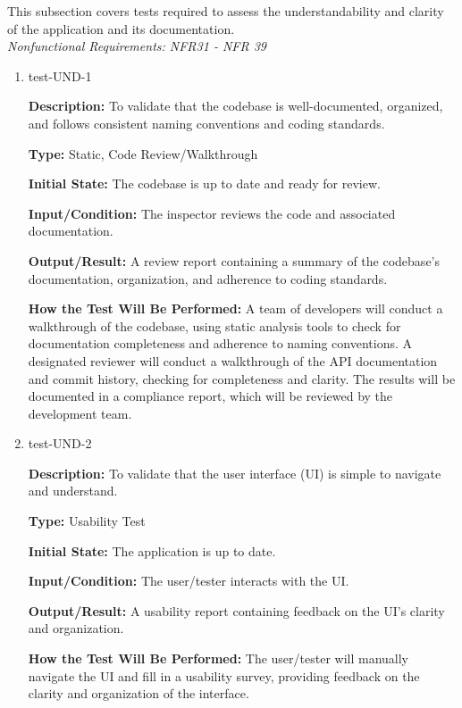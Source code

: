 \documentclass[12pt, titlepage]{article}
\begin{document}
This subsection covers tests required to assess the understandability and clarity of the application and its documentation. \\
\textit{Nonfunctional Requirements: NFR31 - NFR 39}

\begin{enumerate}

\item{test-UND-1\\}

\textbf{Description:} To validate that the codebase is well-documented,
organized, and follows consistent naming conventions and coding standards.

\textbf{Type:} Static, Code Review/Walkthrough
					
\textbf{Initial State:} The codebase is up to date and ready for review.
					
\textbf{Input/Condition:} The inspector reviews the code and associated
documentation.
					
\textbf{Output/Result:} A review report containing a summary of the codebase's
documentation, organization, and adherence to coding standards.
					
\textbf{How the Test Will Be Performed:} A team of developers will conduct a
walkthrough of the codebase, using static analysis tools to check for
documentation completeness and adherence to naming conventions. A designated
reviewer will conduct a walkthrough of the API documentation and commit history,
checking for completeness and clarity. The results will be documented in a
compliance report, which will be reviewed by the development team.

\item{test-UND-2\\}

\textbf{Description:} To validate that the user interface (UI) is simple to
navigate and understand.

\textbf{Type:} Usability Test
					
\textbf{Initial State:} The application is up to date.
					
\textbf{Input/Condition:} The user/tester interacts with the UI.
					
\textbf{Output/Result:} A usability report containing feedback on the UI's
clarity and organization.
					
\textbf{How the Test Will Be Performed:} The user/tester will manually navigate
the UI and fill in a usability survey, providing feedback on the clarity and
organization of the interface.


\end{enumerate}
\end{document}
